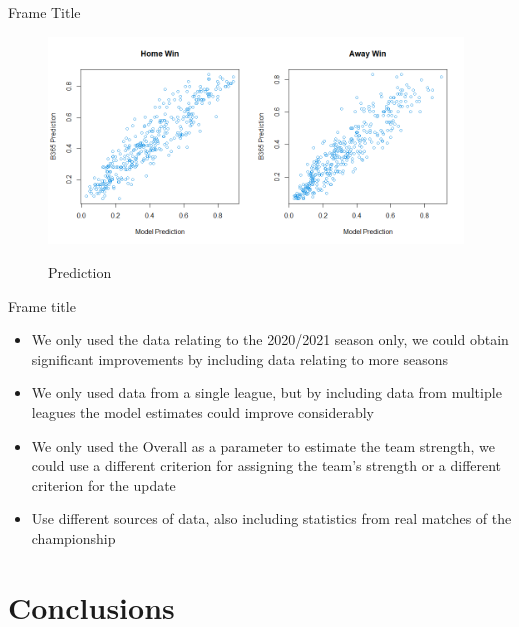 \documentclass[aspectratio=169,xcolor=dvipsnames]{beamer}
\begin{document}
\begin{frame}{Frame Title}
    \begin{figure}[ht] 
        \begin{center} 
            \includegraphics[width=11cm]{Rplot8.png}\\
         \caption{Prediction}
        \end{center}
    \end{figure}
\end{frame}


\begin{frame}{Frame title}
\begin{itemize}

    \item We only used the data relating to the 2020/2021 season only, we could obtain significant improvements by including data relating to more seasons
    
    \item We only used data from a single league, but by including data from multiple leagues the model estimates could improve considerably
    
    \item We only used the Overall as a parameter to estimate the team strength, we could use a different criterion for assigning the team's strength or a different criterion for the update
    
    \item Use different sources of data, also including statistics from real matches of the championship
\end{itemize}
\end{frame}


\section{Conclusions}
\end{document}
